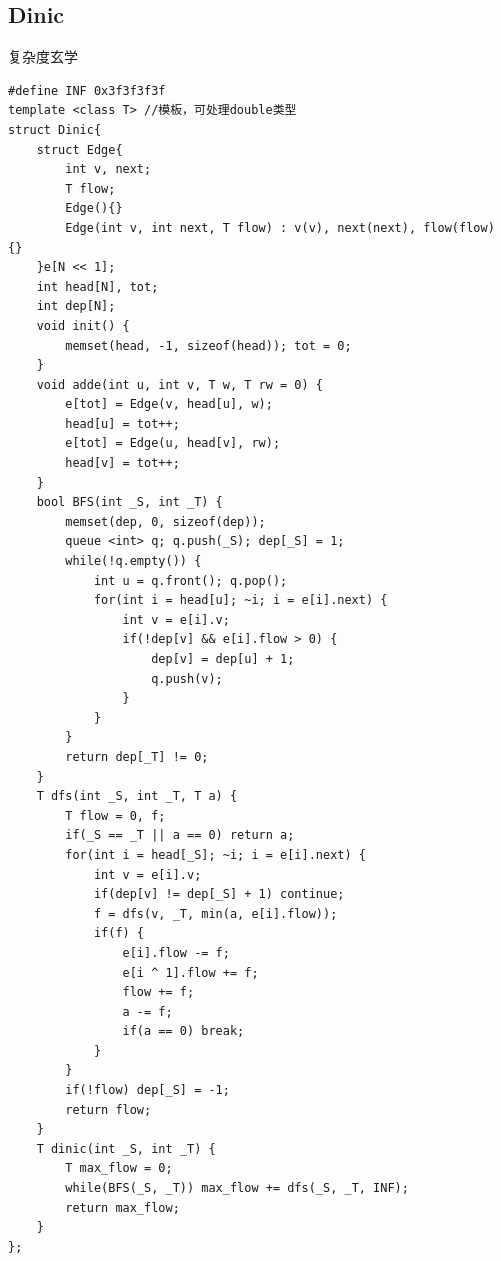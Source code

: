 \documentclass[a4paper,11pt,twoside,fontset = fandol,UTF8]{ctexbook} %
\begin{document}
	\subsection{Dinic}
复杂度玄学
	\begin{lstlisting}
#define INF 0x3f3f3f3f
template <class T> //模板，可处理double类型
struct Dinic{
    struct Edge{
        int v, next;
        T flow;
        Edge(){}
        Edge(int v, int next, T flow) : v(v), next(next), flow(flow) {}
    }e[N << 1];
    int head[N], tot;
    int dep[N];
    void init() {
        memset(head, -1, sizeof(head)); tot = 0;
    }
    void adde(int u, int v, T w, T rw = 0) {
        e[tot] = Edge(v, head[u], w);
        head[u] = tot++;
        e[tot] = Edge(u, head[v], rw);
        head[v] = tot++;
    }
    bool BFS(int _S, int _T) {
        memset(dep, 0, sizeof(dep));
        queue <int> q; q.push(_S); dep[_S] = 1;
        while(!q.empty()) {
            int u = q.front(); q.pop();
            for(int i = head[u]; ~i; i = e[i].next) {
                int v = e[i].v;
                if(!dep[v] && e[i].flow > 0) {
                    dep[v] = dep[u] + 1;
                    q.push(v);
                }
            }
        }
        return dep[_T] != 0;
    }
    T dfs(int _S, int _T, T a) {
        T flow = 0, f;
        if(_S == _T || a == 0) return a;
        for(int i = head[_S]; ~i; i = e[i].next) {
            int v = e[i].v;
            if(dep[v] != dep[_S] + 1) continue;
            f = dfs(v, _T, min(a, e[i].flow));
            if(f) {
                e[i].flow -= f;
                e[i ^ 1].flow += f;
                flow += f;
                a -= f;
                if(a == 0) break;
            }
        }
        if(!flow) dep[_S] = -1;
        return flow;
    }
    T dinic(int _S, int _T) {
        T max_flow = 0;
        while(BFS(_S, _T)) max_flow += dfs(_S, _T, INF);
        return max_flow;
    }
};
	\end{lstlisting}
\end{document}
